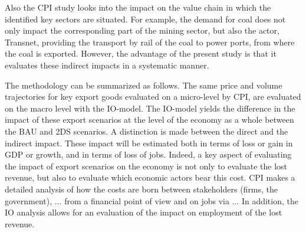 \documentclass[12pt,english]{article}
\begin{document}

Also the CPI study looks into the impact on the value chain in which the identified key sectors are situated. For example, the demand for coal does not only impact the corresponding part of the mining sector, but also the actor, Transnet, providing the transport by rail of the coal to power ports, from where the coal is exported. However, the advantage of the present study is that it evaluates these indirect impacts in a systematic manner.

The methodology can be summarized as follows. The same price and volume trajectories for key export goods %
evaluated on a micro-level by CPI, are evaluated on the macro level with the IO-model. The IO-model yields the difference in the impact of these export scenarios at the level of the economy as a whole between the BAU and 2DS scenarios. A distinction is made between the direct and the indirect impact. %
These impact will be estimated both in terms of loss or gain in GDP or growth, and in terms of loss of jobs. Indeed, a key aspect of evaluating the impact of export scenarios on the economy is not only to evaluate the lost revenue, but also to evaluate which economic actors bear this cost. CPI makes a detailed analysis of how the costs are born between stakeholders (firms, the government), ... from a financial point of view and on jobs via ... In addition, the IO analysis allows for an evaluation of the impact on employment of the lost revenue. 
\end{document}

